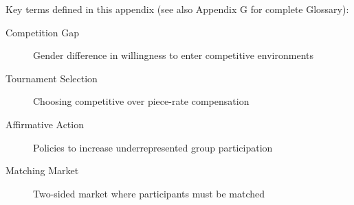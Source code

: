 \begin{abstract}
This appendix integrates Muriel Niederle's research on gender differences in competition and market design into the Evidence-Based Framework. Niederle's work (often with Lise Vesterlund) established that women systematically ``shy away'' from competition even when equally capable, contributing substantially to gender gaps in high-stakes environments. Her research demonstrates that this gap is malleable through institutional design, including affirmative action policies. In collaboration with Alvin Roth, she has also advanced market design, particularly for matching markets. This appendix provides critical parameters for CONTEXT-DEMOGRAPHIC and establishes evidence-based interventions for gender equity.
\end{abstract}

\begin{tcolorbox}[colback=gray!10!white,colframe=gray!50!black,title=Quick Reference]
Key terms defined in this appendix (see also Appendix G for complete Glossary):
\begin{description}
    \item[Competition Gap] Gender difference in willingness to enter competitive environments
    \item[Tournament Selection] Choosing competitive over piece-rate compensation
    \item[Affirmative Action] Policies to increase underrepresented group participation
    \item[Matching Market] Two-sided market where participants must be matched
\end{description}
\end{tcolorbox}


